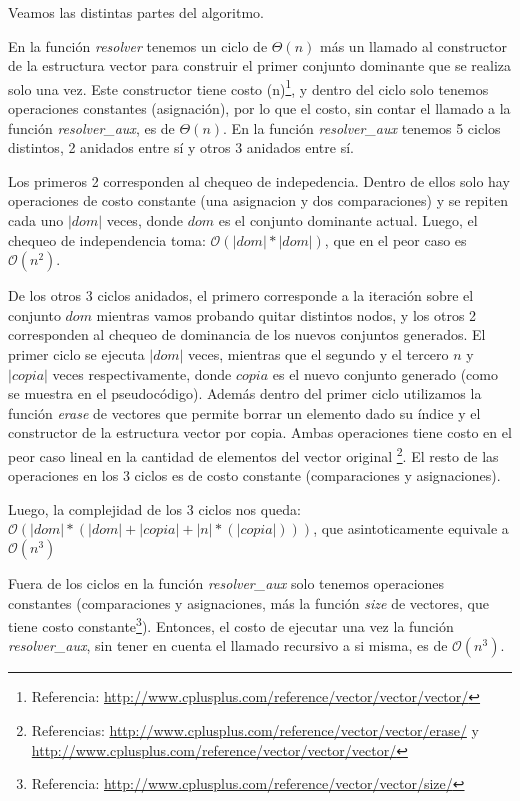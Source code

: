 Veamos las distintas partes del algoritmo.

En la función \textit{resolver} tenemos un ciclo de $\Theta(n)$ más un llamado al constructor de la estructura vector para construir el primer conjunto dominante que se realiza solo una vez. Este constructor tiene costo \Theta(n)\footnote{Referencia: \url{http://www.cplusplus.com/reference/vector/vector/vector/}}, y dentro del ciclo solo tenemos operaciones constantes (asignación), por lo que el costo, sin contar el llamado a la función \textit{resolver_aux}, es de $\Theta(n)$.
En la función \textit{resolver_aux} tenemos 5 ciclos distintos, 2 anidados entre sí y otros 3 anidados entre sí.

Los primeros 2 corresponden al chequeo de indepedencia. Dentro de ellos solo hay operaciones de costo constante (una asignacion y dos comparaciones) y se repiten cada uno $|dom|$ veces, donde $dom$ es el conjunto dominante actual. Luego, el chequeo de independencia toma: $\mathcal{O}(|dom|*|dom|)$, que en el peor caso es $\mathcal{O}(n^2)$.

De los otros 3 ciclos anidados, el primero corresponde a la iteración sobre el conjunto $dom$ mientras vamos probando quitar distintos nodos, y los otros 2 corresponden al chequeo de dominancia de los nuevos conjuntos generados.
El primer ciclo se ejecuta $|dom|$ veces, mientras que el segundo y el tercero $n$ y $|copia|$ veces respectivamente, donde $copia$ es el nuevo conjunto generado (como se muestra en el pseudocódigo). Además dentro del primer ciclo utilizamos la función \textit{erase} de vectores que permite borrar un elemento dado su índice y el constructor de la estructura vector por copia. Ambas operaciones tiene costo en el peor caso lineal en la cantidad de elementos del vector original \footnote{Referencias: \url{http://www.cplusplus.com/reference/vector/vector/erase/} y \url{http://www.cplusplus.com/reference/vector/vector/vector/}}. El resto de las operaciones en los 3 ciclos es de costo constante (comparaciones y asignaciones).

Luego, la complejidad de los 3 ciclos nos queda: $\mathcal{O}(|dom|*(|dom| + |copia| + |n|* (|copia|)))$, que asintoticamente equivale a $\mathcal{O}(n^3)$

Fuera de los ciclos en la función \textit{resolver_aux} solo tenemos operaciones constantes (comparaciones y asignaciones, más la función \textit{size} de vectores, que tiene costo constante\footnote{Referencia: \url{http://www.cplusplus.com/reference/vector/vector/size/}}). Entonces, el costo de ejecutar una vez la función \textit{resolver_aux}, sin tener en cuenta el llamado recursivo a si misma, es de $\mathcal{O}(n^3)$.

